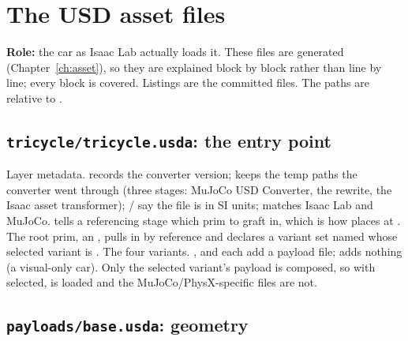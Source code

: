 \chapter{The USD asset files}
\label{ch:usd}

\textbf{Role:} the car as Isaac Lab actually loads it. These files are
generated (Chapter~\ref{ch:asset}), so they are explained block by block
rather than line by line; every block is covered. Listings are the committed
files. The paths are relative to .

\newcommand{\usdpart}[3]{}
\newcommand{\usdfile}[1]{}

\section{\texttt{tricycle/tricycle.usda}: the entry point}

\usdfile{\srcroot/assets/tricycle/tricycle.usda}

\begin{explain}
 Layer metadata.  records the converter version;
   keeps the temp paths the converter went through (three
  stages: MuJoCo USD Converter, the  rewrite, the Isaac asset
  transformer); / say the file is
  in SI units;  matches Isaac Lab and MuJoCo.
   tells a referencing stage which prim to
  graft in, which is how  places  at
  .
 The root prim, an , pulls in 
  by reference and declares a variant set named  whose
  selected variant is .
 The four variants. ,  and
   each add a payload file;  adds nothing (a
  visual-only car). Only the selected variant's payload is composed, so with
   selected,  is loaded and the
  MuJoCo/PhysX-specific files are not.
\end{explain}

\section{\texttt{payloads/base.usda}: geometry}

